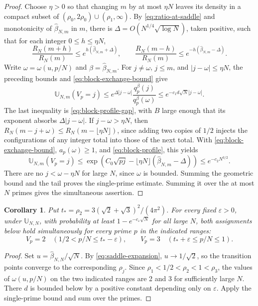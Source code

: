 \documentclass[11pt]{amsart}
\newtheorem{corollary}[theorem]{Corollary}
\theoremstyle{remark}
\begin{document}
\begin{proof}
Choose \(\eta>0\) so that changing \(m\) by at most \(\eta N\) leaves
its density in a compact subset of \((\rho_0,2\rho_0)\cup(\rho_1,\infty)\).
By \eqref{eq:ratio-at-saddle} and monotonicity of
\(\widehat\beta_{N,m}\) in \(m\), there is
\(\Delta=O(N^{1/4}\sqrt{\log N})\), taken positive, such that
for each integer \(0\le h\le\eta N\),
\[
 \frac{R_N(m+h)}{R_N(m)}\le e^{h(\widehat\beta_{N,m}+\Delta)},
 \qquad
 \frac{R_N(m-h)}{R_N(m)}\le e^{-h(\widehat\beta_{N,m}-\Delta)} .
\]
Write \(\omega=\omega(u,p/N)\) and \(\beta=\widehat\beta_{N,m}\).
For \(j\ne\omega\), \(j\le m\), and \(|j-\omega|\le\eta N\),
the preceding bounds and \eqref{eq:block-exchange-bound} give
\[
 \mathbb U_{N,m}(V_p=j)
 \le e^{\Delta|j-\omega|}\frac{q_p^\beta(j)}{q_p^\beta(\omega)}
 \le e^{-c_1 d\sqrt N|j-\omega|}.
\]
The last inequality is \eqref{eq:block-profile-gap}, with \(B\) large
enough that its exponent absorbs \(\Delta|j-\omega|\).
If \(j-\omega>\eta N\), then \(R_N(m-j+\omega)\le
R_N(m-\lfloor\eta N\rfloor)\), since adding two copies of \(1/2\)
injects the configurations of any integer total into those of the
next total. With \eqref{eq:block-exchange-bound}, \(a_p(\omega)\ge 1\),
and \eqref{eq:block-profile}, this yields
\[
 \mathbb U_{N,m}(V_p=j)
 \le \exp\!\left(C_0\sqrt{pj}
       -\lfloor\eta N\rfloor(\widehat\beta_{N,m}-\Delta)\right)
 \le e^{-c_2 N^{3/2}}.
\]
There are no \(j<\omega-\eta N\) for large \(N\), since \(\omega\)
is bounded. Summing the geometric bound and the tail proves the
single-prime estimate. Summing it over the at most \(N\) primes
gives the simultaneous assertion.
\end{proof}

\begin{corollary}
\label{cor:diagonal-concentration}
Put \(t_*=\rho_2=3(\sqrt2+\sqrt3)^2/(4\pi^2)\).
For every fixed \(\varepsilon>0\), under \(\mathbb U_{N,N}\), with
probability at least \(1-e^{-c_\varepsilon\sqrt N}\) for all large \(N\),
both assignments below hold simultaneously for every prime \(p\) in the
indicated ranges:
\[
 V_p=2\quad (1/2<p/N\le t_*-\varepsilon),\qquad
 V_p=3\quad (t_*+\varepsilon\le p/N\le 1).
\]
\end{corollary}

\begin{proof}
Set \(u=\widehat\beta_{N,N}/\sqrt N\). By \eqref{eq:saddle-expansion},
\(u\to1/\sqrt2\), so the transition points converge to the corresponding
\(\rho_j\). Since \(\rho_1<1/2<\rho_2<1<\rho_3\), the values of
\(\omega(u,p/N)\) on the two indicated ranges are 2 and 3 for sufficiently large \(N\). There
\(d\) is bounded below by a positive constant depending only on
\(\varepsilon\). Apply the single-prime bound and sum over the primes.
\end{proof}
\end{document}
